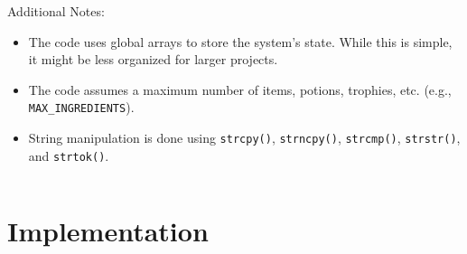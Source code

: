 \documentclass[12pt,a4paper]{article}
\begin{document}
Additional Notes:
\begin{itemize}
  \item The code uses global arrays to store the system's state. While this is simple, it might be less organized for larger projects.
  \item The code assumes a maximum number of items, potions, trophies, etc. (e.g., \texttt{MAX\_INGREDIENTS}).
  \item String manipulation is done using \texttt{strcpy()}, \texttt{strncpy()}, \texttt{strcmp()}, \texttt{strstr()}, and \texttt{strtok()}.
\end{itemize}

\begin{verbatim}

\end{verbatim}

\section{Implementation}
\end{document}
